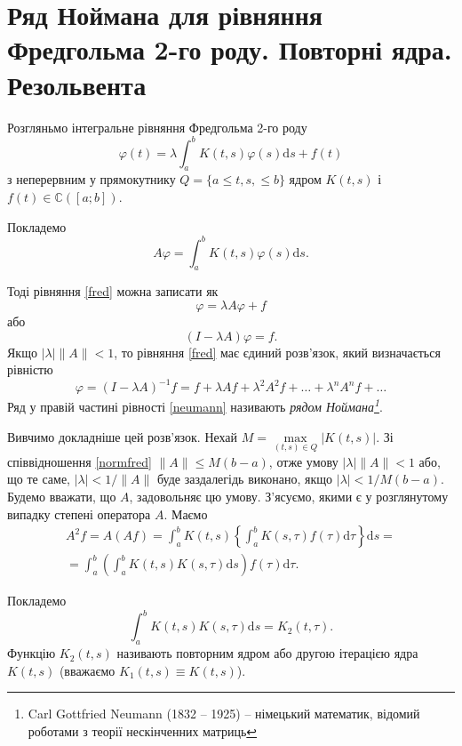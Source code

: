 \documentclass[14pt,twoside]{extreport}
\theoremstyle{mystyle}
\numberwithin{equation}{chapter}
\newcommand{\cab}{\mathbb{C}([a; b])}
\begin{document}
\section{Ряд Ноймана для рівняння Фредгольма 2-го роду. Повторні ядра. Резольвента}

Розгляньмо інтегральне рівняння Фредгольма 2-го роду
\begin{equation}\label{fred}
\varphi(t)=\lambda\int_{a}^{b} K(t,s) \varphi(s)\mathrm{d}s + f(t)
\end{equation}
з неперервним у прямокутнику $Q=\{a\leqslant t, s, \leqslant b\}$ ядром $K(t,s)$ і $f(t) \in \cab$.

Покладемо
\[
A \varphi = \int_{a}^{b} K(t,s) \varphi(s)\mathrm{d}s.
\]

Тоді рівняння \eqref{fred} можна записати як
\[
\varphi = \lambda A \varphi + f
\]
або
\begin{equation}
(I-\lambda A) \varphi = f.
\end{equation}
Якщо $|\lambda| \|A\| < 1$, то рівняння \eqref{fred} має єдиний розв'язок, який визначається рівністю
\begin{equation}\label{neumann}
\varphi=(I-\lambda A)^{-1} f = f + \lambda A f + \lambda^2 A^2 f + \ldots + \lambda^n A^n f + \ldots
\end{equation}
Ряд у правій частині рівності \eqref{neumann} називають \textit{рядом Ноймана\footnote{Carl Gottfried Neumann (1832 -- 1925) -- німецький математик, відомий роботами з теорії нескінченних матриць}}.

Вивчимо докладніше цей розв'язок. Нехай $M = \max\limits_{(t,s) \in Q} |K(t, s)|$. Зі співвідношення \eqref{normfred} $\|A\|\leqslant M(b-a)$, отже умову $|\lambda|\|A\|<1$ або, що те саме, $|\lambda|<1/\|A\|$ буде заздалегідь виконано, якщо $|\lambda|<1/M(b-a)$. Будемо вважати, що $A$, задовольняє цю умову. З'ясуємо, якими є у розглянутому випадку степені оператора $A$. Маємо
\begin{multline*}
 A^2f=A(Af)=\int_{a}^{b} K(t,s) \left\{\int_{a}^{b} K(s,\tau) f(\tau)\mathrm{d}\tau\right\}\mathrm{d}s=\\
 =\int_{a}^{b} \left(\int_{a}^{b} K(t, s) K(s, \tau)\mathrm{d}s\right)f(\tau)\mathrm{d}\tau.
\end{multline*}

Покладемо
\[
 \int_{a}^{b} K(t, s) K(s, \tau)\mathrm{d}s=K_2(t, \tau).
\]
Функцію $K_2(t, s)$ називають повторним ядром або другою ітерацією ядра $K(t, s)$ (вважаємо $K_1(t, s) \equiv K(t, s)$).
\end{document}

